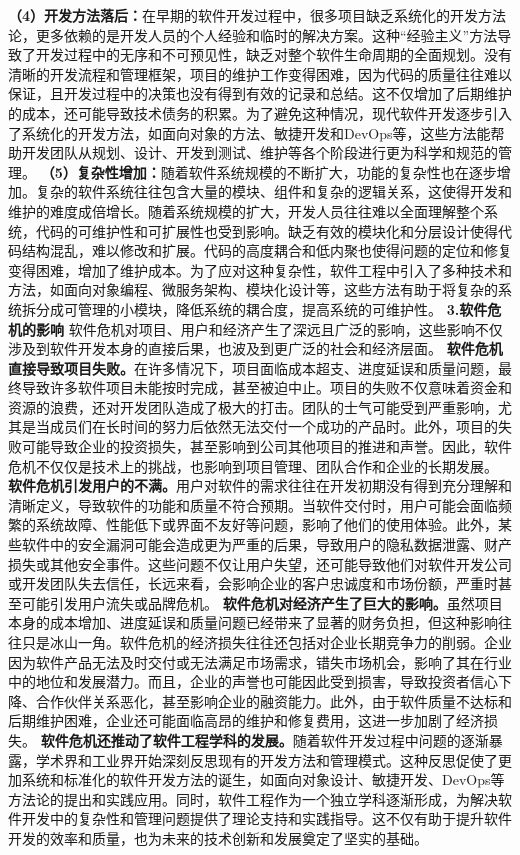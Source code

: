 \textbf{（4）开发方法落后：}在早期的软件开发过程中，很多项目缺乏系统化的开发方法论，更多依赖的是开发人员的个人经验和临时的解决方案。这种``经验主义''方法导致了开发过程中的无序和不可预见性，缺乏对整个软件生命周期的全面规划。没有清晰的开发流程和管理框架，项目的维护工作变得困难，因为代码的质量往往难以保证，且开发过程中的决策也没有得到有效的记录和总结。这不仅增加了后期维护的成本，还可能导致技术债务的积累。为了避免这种情况，现代软件开发逐步引入了系统化的开发方法，如面向对象的方法、敏捷开发和DevOps等，这些方法能帮助开发团队从规划、设计、开发到测试、维护等各个阶段进行更为科学和规范的管理。
\textbf{（5）复杂性增加：}随着软件系统规模的不断扩大，功能的复杂性也在逐步增加。复杂的软件系统往往包含大量的模块、组件和复杂的逻辑关系，这使得开发和维护的难度成倍增长。随着系统规模的扩大，开发人员往往难以全面理解整个系统，代码的可维护性和可扩展性也受到影响。缺乏有效的模块化和分层设计使得代码结构混乱，难以修改和扩展。代码的高度耦合和低内聚也使得问题的定位和修复变得困难，增加了维护成本。为了应对这种复杂性，软件工程中引入了多种技术和方法，如面向对象编程、微服务架构、模块化设计等，这些方法有助于将复杂的系统拆分成可管理的小模块，降低系统的耦合度，提高系统的可维护性。
\textbf{3.软件危机的影响} 软件危机对项目、用户和经济产生了深远且广泛的影响，这些影响不仅涉及到软件开发本身的直接后果，也波及到更广泛的社会和经济层面。
\textbf{软件危机直接导致项目失败。}在许多情况下，项目面临成本超支、进度延误和质量问题，最终导致许多软件项目未能按时完成，甚至被迫中止。项目的失败不仅意味着资金和资源的浪费，还对开发团队造成了极大的打击。团队的士气可能受到严重影响，尤其是当成员们在长时间的努力后依然无法交付一个成功的产品时。此外，项目的失败可能导致企业的投资损失，甚至影响到公司其他项目的推进和声誉。因此，软件危机不仅仅是技术上的挑战，也影响到项目管理、团队合作和企业的长期发展。
\textbf{软件危机引发用户的不满。}用户对软件的需求往往在开发初期没有得到充分理解和清晰定义，导致软件的功能和质量不符合预期。当软件交付时，用户可能会面临频繁的系统故障、性能低下或界面不友好等问题，影响了他们的使用体验。此外，某些软件中的安全漏洞可能会造成更为严重的后果，导致用户的隐私数据泄露、财产损失或其他安全事件。这些问题不仅让用户失望，还可能导致他们对软件开发公司或开发团队失去信任，长远来看，会影响企业的客户忠诚度和市场份额，严重时甚至可能引发用户流失或品牌危机。
\textbf{软件危机对经济产生了巨大的影响。}虽然项目本身的成本增加、进度延误和质量问题已经带来了显著的财务负担，但这种影响往往只是冰山一角。软件危机的经济损失往往还包括对企业长期竞争力的削弱。企业因为软件产品无法及时交付或无法满足市场需求，错失市场机会，影响了其在行业中的地位和发展潜力。而且，企业的声誉也可能因此受到损害，导致投资者信心下降、合作伙伴关系恶化，甚至影响企业的融资能力。此外，由于软件质量不达标和后期维护困难，企业还可能面临高昂的维护和修复费用，这进一步加剧了经济损失。
\textbf{软件危机还推动了软件工程学科的发展。}随着软件开发过程中问题的逐渐暴露，学术界和工业界开始深刻反思现有的开发方法和管理模式。这种反思促使了更加系统和标准化的软件开发方法的诞生，如面向对象设计、敏捷开发、DevOps等方法论的提出和实践应用。同时，软件工程作为一个独立学科逐渐形成，为解决软件开发中的复杂性和管理问题提供了理论支持和实践指导。这不仅有助于提升软件开发的效率和质量，也为未来的技术创新和发展奠定了坚实的基础。
